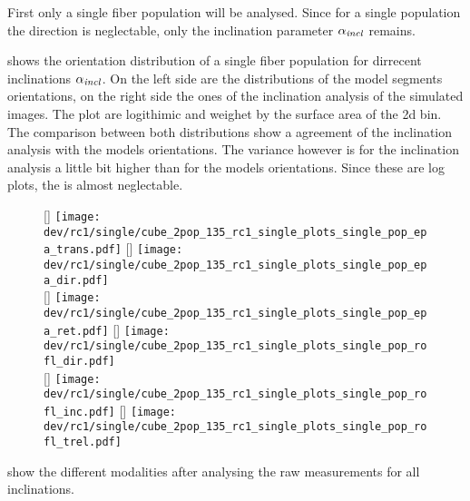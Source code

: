 % 
First only a single fiber population will be analysed.
Since for a single population the direction is neglectable, only the inclination parameter $\textnormal{$\alpha_{\mathit{incl}}$}{}$ remains.
% 
\par
{} shows the orientation distribution of a single fiber population for dirrecent inclinations $\textnormal{$\alpha_{\mathit{incl}}$}{}$.
On the left side are the distributions of the model segments orientations, on the right side the ones of the inclination analysis of the simulated images.
The plot are logithimic and weighet by the surface area of the 2d bin.
The comparison between both distributions show a agreement of the inclination analysis with the models orientations.
The variance however is for the inclination analysis a little bit higher than for the models orientations.
Since these are log plots, the  is almost neglectable.
% 
% 
% 
\begin{figure}[!p]
\centering
\setlength{\width}{0.45\textwidth}
[\width]{
\texttt{[image: dev/rc1/single/cube\_2pop\_135\_rc1\_single\_plots\_single\_pop\_epa\_trans.pdf]}}\hfill
{}[\width]{
\texttt{[image: dev/rc1/single/cube\_2pop\_135\_rc1\_single\_plots\_single\_pop\_epa\_dir.pdf]}}
\\[2em]
[\width]{
\texttt{[image: dev/rc1/single/cube\_2pop\_135\_rc1\_single\_plots\_single\_pop\_epa\_ret.pdf]}}\hfill
{}[\width]{
\texttt{[image: dev/rc1/single/cube\_2pop\_135\_rc1\_single\_plots\_single\_pop\_rofl\_dir.pdf]}}
\\[2em]
[\width]{
\texttt{[image: dev/rc1/single/cube\_2pop\_135\_rc1\_single\_plots\_single\_pop\_rofl\_inc.pdf]}}\hfill
{}[\width]{
\texttt{[image: dev/rc1/single/cube\_2pop\_135\_rc1\_single\_plots\_single\_pop\_rofl\_trel.pdf]}}
\caption[]{}
\label{fig:single_fiber_pop_rofl}
\end{figure}
% 
\par
{} show the different modalities after analysing the raw measurements for all inclinations.
